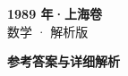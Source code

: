 \documentclass[zihao=-4, a4paper]{ctexart}
\begin{document}
\begin{center}
  {\Large\bfseries 1989 年·上海卷}\\[4pt]
  {\large 数学 · 解析版}
\end{center}
\medskip
{}

\clearpage
{}
\begin{center}{\Large\bfseries 参考答案与详细解析}\end{center}
\medskip

\end{document}
